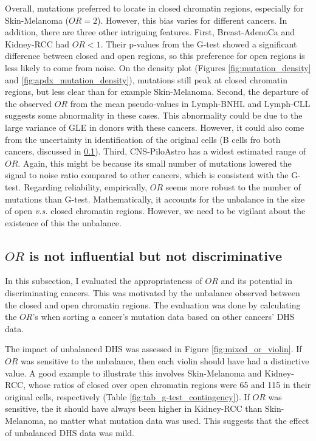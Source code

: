 Overall, mutations preferred to locate in closed chromatin regions, especially for Skin-Melanoma ($OR=2$). However, this bias varies for different cancers. In addition, there are three other intriguing features. First, Breast-AdenoCa and Kidney-RCC had $OR<1$. Their p-values from the G-test showed a significant difference between closed and open regions, so this preference for open regions is less likely to come from noise. On the density plot (Figures \ref{fig:mutation_density} and \ref{fig:apdx_mutation_density}), mutations still peak at closed chromatin regions, but less clear than for example Skin-Melanoma. Second, the departure of the observed $OR$ from the mean pseudo-values in Lymph-BNHL and Lymph-CLL suggests some abnormality in these cases. This abnormality could be due to the large variance of GLE in donors with these cancers. However, it could also come from the uncertainty in identification of the original cells (B cells fro both cancers, discussed in \ref{}). Third, CNS-PiloAstro has a widest estimated range of $OR$. Again, this might be because its small number of mutations lowered the signal to noise ratio compared to other cancers, which is consistent with the G-test. Regarding reliability, empirically, $OR$ seems more robust to the number of mutations than G-test. Mathematically, it accounts for the unbalance in the size of open \textit{v.s.} closed chromatin regions. However, we need to be vigilant about the existence of this the unbalance.

\subsection{$OR$ is not influential but not discriminative}

In this subsection, I evaluated the appropriateness of $OR$ and its potential in discriminating cancers. This was motivated by the unbalance observed between the closed and open chromatin regions. The evaluation was done by calculating the $OR$'s when sorting a cancer's mutation data based on other cancers' DHS data. 

The impact of unbalanced DHS was assessed in Figure \ref{fig:mixed_or_violin}. If $OR$ was sensitive to the unbalance, then each violin should have had a distinctive value. A good example to illustrate this involves Skin-Melanoma and Kidney-RCC, whose ratios of closed over open chromatin regions were 65 and 115 in their original cells, respectively (Table \ref{fig:tab_g-test_contingency}). If $OR$ was sensitive, the it should have always been higher in Kidney-RCC than Skin-Melanoma, no matter what mutation data was used. This suggests that the effect of unbalanced DHS data was mild.


